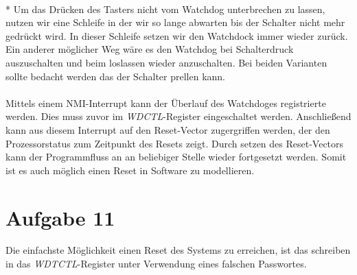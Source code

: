 \paragraph{}*
Um das Drücken des Tasters nicht vom Watchdog unterbrechen zu lassen, nutzen wir eine Schleife in der wir so lange abwarten bis der Schalter nicht mehr gedrückt wird. In dieser Schleife setzen wir den Watchdock immer wieder zurück. Ein anderer möglicher Weg wäre es den Watchdog bei Schalterdruck auszuschalten und beim loslassen wieder anzuschalten. Bei beiden Varianten sollte bedacht werden das der Schalter prellen kann. \\



\paragraph*{}
Mittels einem NMI-Interrupt kann der Überlauf des Watchdoges registrierte werden. Dies muss zuvor im {\em WDCTL}-Register eingeschaltet werden. Anschließend kann aus diesem Interrupt auf den Reset-Vector zugergriffen werden, der den Prozessorstatus zum Zeitpunkt des Resets zeigt. Durch setzen des Reset-Vectors kann der Programmfluss an an beliebiger Stelle wieder fortgesetzt werden. Somit ist es auch möglich einen Reset in Software zu modellieren.

\section*{Aufgabe 11}

Die einfachste Möglichkeit einen Reset des Systems zu erreichen, ist das schreiben in das {\em WDTCTL}-Register unter Verwendung eines falschen Passwortes.\\



